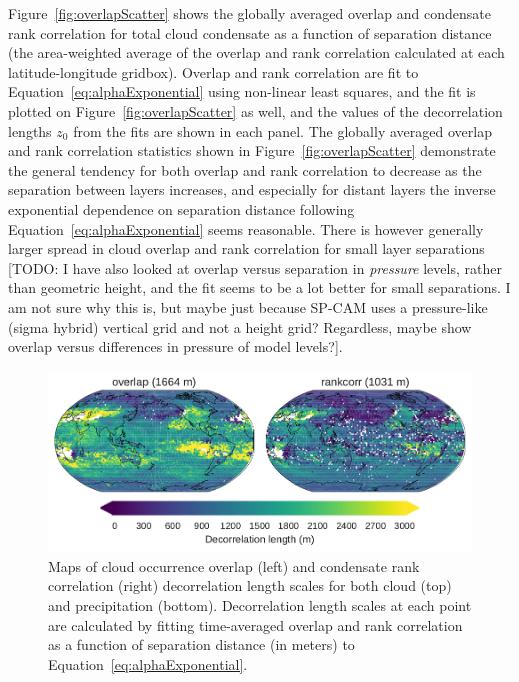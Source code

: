 Figure~\ref{fig:overlapScatter} shows the globally averaged overlap and
condensate rank correlation for total cloud condensate as a function of
separation distance (the area-weighted average of the overlap and rank
correlation calculated at each latitude-longitude gridbox). Overlap and
rank correlation are fit to Equation~\ref{eq:alphaExponential} using
non-linear least squares, and the fit is plotted on
Figure~\ref{fig:overlapScatter} as well, and the values of the
decorrelation lengths \(z_0\) from the fits are shown in each panel. The
globally averaged overlap and rank correlation statistics shown in
Figure~\ref{fig:overlapScatter} demonstrate the general tendency for
both overlap and rank correlation to decrease as the separation between
layers increases, and especially for distant layers the inverse
exponential dependence on separation distance following
Equation~\ref{eq:alphaExponential} seems reasonable. There is however
generally larger spread in cloud overlap and rank correlation for small
layer separations {[}TODO: I have also looked at overlap versus
separation in \emph{pressure} levels, rather than geometric height, and
the fit seems to be a lot better for small separations. I am not sure
why this is, but maybe just because SP-CAM uses a pressure-like (sigma
hybrid) vertical grid and not a height grid? Regardless, maybe show
overlap versus differences in pressure of model levels?{]}.

\begin{figure}[htbp]
\centering
\includegraphics{graphics/subgrid2_overlap_maps.pdf}
\caption{\label{fig:overlapMaps}Maps of cloud occurrence overlap (left)
and condensate rank correlation (right) decorrelation length scales for
both cloud (top) and precipitation (bottom). Decorrelation length scales
at each point are calculated by fitting time-averaged overlap and rank
correlation as a function of separation distance (in meters) to
Equation~\ref{eq:alphaExponential}.}\label{fig:overlapMaps}
\end{figure}

